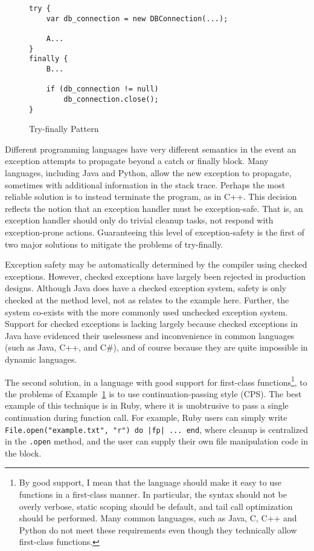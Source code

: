 \documentclass[11pt]{article}
\begin{document}
\begin{figure}[h]
\caption{Try-finally Pattern}
\label{tryPattern}
\begin{verbatim}
try {  
    var db_connection = new DBConnection(...);

    A...
}
finally {
    B...

    if (db_connection != null)
        db_connection.close();
}
\end{verbatim}
\end{figure}

Different programming languages have very different semantics in the event an exception attempts to propagate beyond a catch or finally block.
Many languages, including Java and Python, allow the new exception to propagate, sometimes with additional information in the stack trace.
Perhaps the most reliable solution is to instead terminate the program, as in C++.\cite{evolutionCplusplus}
This decision reflects the notion that an exception handler must be exception-safe.
That is, an exception handler should only do trivial cleanup tasks, not respond with exception-prone actions.
Guaranteeing this level of exception-safety is the first of two major solutions to mitigate the problems of try-finally.

Exception safety may be automatically determined by the compiler using checked exceptions.
However, checked exceptions have largely been rejected in production designs.
Although Java does have a checked exception system, safety is only checked at the method level, not as relates to the example here.
Further, the system co-exists with the more commonly used unchecked exception system.
Support for checked exceptions is lacking largely because checked exceptions in Java have evidenced their uselessness and inconvenience in common languages (such as Java, C++, and C\#), and of course because they are quite impossible in dynamic languages.

The second solution, in a language with good support for first-class functions\footnote{By good support, I mean that the language should make it easy to use functions in a first-class manner. In particular, the syntax should not be overly verbose, static scoping should be default, and tail call optimization should be performed. Many common languages, such as Java, C, C++ and Python do not meet these requirements even though they technically allow first-class functions.}, to the problems of Example~\ref{tryPattern} is to use continuation-passing style (CPS).
The best example of this technique is in Ruby, where it is unobtrusive to pass a single continuation during function call.
For example, Ruby users can simply write \texttt{File.open("example.txt", "r") do |fp| ... end}, where cleanup is centralized in the \texttt{.open} method, and the user can supply their own file manipulation code in the block.\cite{programmingRuby}
\end{document}

